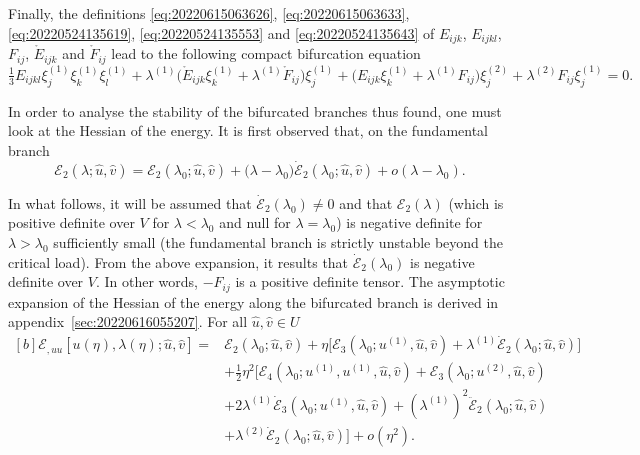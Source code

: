 \documentclass[12pt, final]{scrartcl}
\theoremstyle{definition}
\newcommand{\E}{\mathcal E}
\newcommand{\order}[2][1]{#2^{(#1)}}
\begin{document}
Finally, the definitions \eqref{eq:20220615063626}, \eqref{eq:20220615063633},
\eqref{eq:20220524135619}, \eqref{eq:20220524135553} and
\eqref{eq:20220524135643} of $E_{ijk}$, $E_{ijkl}$, $F_{ij}$,
$\mathring{E}_{ijk}$ and $\mathring{F}_{ij}$ lead to the following compact
bifurcation equation
\begin{equation}
  \label{eq:20220601070917}
  \tfrac{1}{3} E_{ijkl} \order[1]{ξ_j} \order[1]{ξ_k} \order[1]{ξ_l} + \order[1]\lambda \bigl( \mathring{E}_{ijk} \order[1]{ξ_k} + \order[1]\lambda \mathring{F}_{ij} \bigr)\order[1]{ξ_j} + \bigl(E_{ijk} \order[1]{ξ_k} + \order[1]\lambda F_{ij}\bigr) \order[2]{ξ_j} + \order[2]\lambda F_{ij} \order[1]{ξ_j} = 0.
\end{equation}

In order to analyse the stability of the bifurcated branches thus found, one
must look at the Hessian of the energy. It is first observed that, on the
fundamental branch
\begin{equation}
 \E_2(\lambda; \hat{u}, \hat{v}) = \E_2(\lambda_0; \hat{u}, \hat{v}) + \bigl(\lambda - \lambda_0\bigr) \dot{\E}_2(\lambda_0; \hat{u}, \hat{v}) + o(\lambda - \lambda_0).
\end{equation}

In what follows, it will be assumed that $\dot{\E}_2(\lambda_0)≠0$ and that $\E_2(\lambda)$
(which is positive definite over $V$ for $\lambda<\lambda_0$ and null for $\lambda=\lambda_0$) is
negative definite for $\lambda>\lambda_0$ sufficiently small (the fundamental branch is
strictly unstable beyond the critical load). From the above expansion, it
results that $\dot{\E}_2(\lambda_0)$ is negative definite over $V$. In other words,
$-F_{ij}$ is a positive definite tensor. The asymptotic expansion of the
Hessian of the energy along the bifurcated branch is derived in
appendix~\ref{sec:20220616055207}. For all $\hat{u}, \hat{v} \in U$
\begin{equation}
  \label{eq:20220531054247}
  \begin{aligned}[b]
    \E_{, uu}[u(η), \lambda(η); \hat{u}, \hat{v}] ={}
    & \E_2(\lambda_0 ; \hat{u}, \hat{v}) + η \bigl[\E_3(\lambda_0 ; \order[1]u, \hat{u}, \hat{v})  + \order[1]\lambda \dot{\E}_2(\lambda_0; \hat{u}, \hat{v})\bigr]\\
    &+ \tfrac{1}{2} η^2 \bigl[\E_4(\lambda_0; \order[1]u, \order[1]u, \hat{u}, \hat{v}) + \E_3(\lambda_0; \order[2]u, \hat{u}, \hat{v})\\
    & + 2\order[1]\lambda \dot{\E}_3(\lambda_0; \order[1]u, \hat{u}, \hat{v}) + ( \order[1]\lambda )^2 \ddot{\E}_2(\lambda_0; \hat{u}, \hat{v})\\
    & + \order[2]\lambda \dot{\E}_2(\lambda_0; \hat{u}, \hat{v}) \bigr] + o(η^2).
  \end{aligned}
\end{equation}
\end{document}
